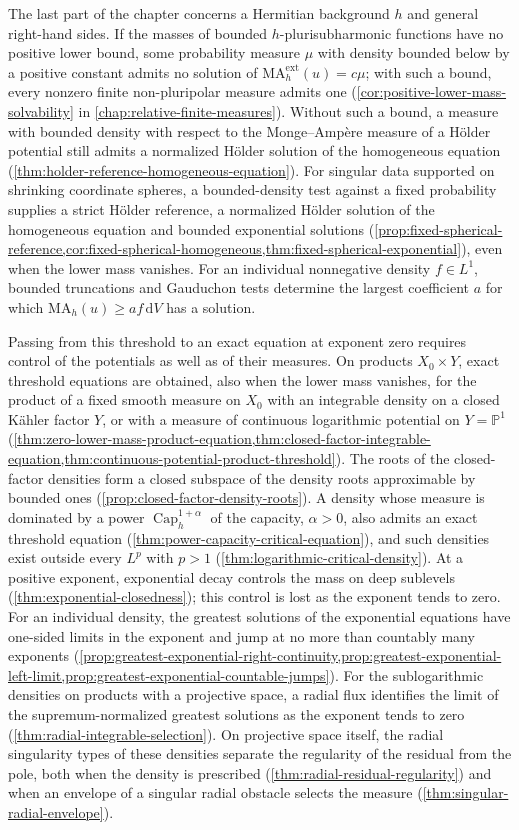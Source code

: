 The last part of the chapter concerns a Hermitian background $h$ and general right-hand sides. If the masses of bounded $h$-plurisubharmonic functions have no positive lower bound, some probability measure $\mu$ with density bounded below by a positive constant admits no solution of $\mathrm{MA}^{\mathrm{ext}}_h(u)=c\mu$; with such a bound, every nonzero finite non-pluripolar measure admits one (\cref{cor:positive-lower-mass-solvability} in \cref{chap:relative-finite-measures}). Without such a bound, a measure with bounded density with respect to the Monge--Amp\`ere measure of a H\"older potential still admits a normalized H\"older solution of the homogeneous equation (\cref{thm:holder-reference-homogeneous-equation}). For singular data supported on shrinking coordinate spheres, a bounded-density test against a fixed probability supplies a strict H\"older reference, a normalized H\"older solution of the homogeneous equation and bounded exponential solutions (\cref{prop:fixed-spherical-reference,cor:fixed-spherical-homogeneous,thm:fixed-spherical-exponential}), even when the lower mass vanishes. For an individual nonnegative density $f\in L^1$, bounded truncations and Gauduchon tests determine the largest coefficient $a$ for which $\mathrm{MA}_h(u)\geq af\,\mathrm{d}V$ has a solution.

Passing from this threshold to an exact equation at exponent zero requires control of the potentials as well as of their measures. On products $X_0\times Y$, exact threshold equations are obtained, also when the lower mass vanishes, for the product of a fixed smooth measure on $X_0$ with an integrable density on a closed K\"ahler factor $Y$, or with a measure of continuous logarithmic potential on $Y=\mathbb P^1$ (\cref{thm:zero-lower-mass-product-equation,thm:closed-factor-integrable-equation,thm:continuous-potential-product-threshold}). The roots of the closed-factor densities form a closed subspace of the density roots approximable by bounded ones (\cref{prop:closed-factor-density-roots}). A density whose measure is dominated by a power $\operatorname{Cap}_h^{1+\alpha}$ of the capacity, $\alpha>0$, also admits an exact threshold equation (\cref{thm:power-capacity-critical-equation}), and such densities exist outside every $L^p$ with $p>1$ (\cref{thm:logarithmic-critical-density}). At a positive exponent, exponential decay controls the mass on deep sublevels (\cref{thm:exponential-closedness}); this control is lost as the exponent tends to zero. For an individual density, the greatest solutions of the exponential equations have one-sided limits in the exponent and jump at no more than countably many exponents (\cref{prop:greatest-exponential-right-continuity,prop:greatest-exponential-left-limit,prop:greatest-exponential-countable-jumps}). For the sublogarithmic densities on products with a projective space, a radial flux identifies the limit of the supremum-normalized greatest solutions as the exponent tends to zero (\cref{thm:radial-integrable-selection}). On projective space itself, the radial singularity types of these densities separate the regularity of the residual from the pole, both when the density is prescribed (\cref{thm:radial-residual-regularity}) and when an envelope of a singular radial obstacle selects the measure (\cref{thm:singular-radial-envelope}).

